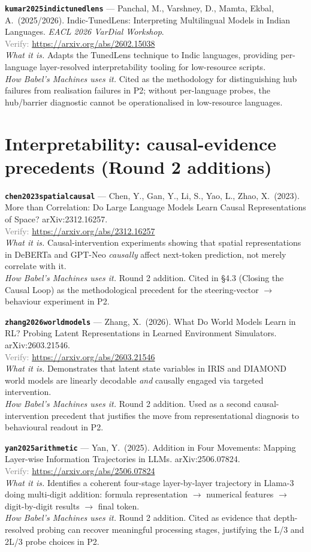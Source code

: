 \documentclass[11pt,a4paper]{article}
\newcommand{\entry}[5]{%
  \par\smallskip
  \noindent\textbf{\texttt{#1}} --- #2\\
  {\footnotesize \textcolor{gray}{Verify:} \url{#3}}\\
  \textit{What it is.} #4\\
  \textit{How Babel's Machines uses it.} #5
  \par\medskip
}
\begin{document}
\entry{kumar2025indictunedlens}
{Panchal, M., Varshney, D., Mamta, Ekbal, A.\ (2025/2026). Indic-TunedLens: Interpreting Multilingual Models in Indian Languages. \emph{EACL 2026 VarDial Workshop}.}
{https://arxiv.org/abs/2602.15038}
{Adapts the TunedLens technique to Indic languages, providing per-language layer-resolved interpretability tooling for low-resource scripts.}
{Cited as the methodology for distinguishing hub failures from realisation failures in P2; without per-language probes, the hub/barrier diagnostic cannot be operationalised in low-resource languages.}

\section{Interpretability: causal-evidence precedents (Round 2 additions)}

\entry{chen2023spatialcausal}
{Chen, Y., Gan, Y., Li, S., Yao, L., Zhao, X.\ (2023). More than Correlation: Do Large Language Models Learn Causal Representations of Space? arXiv:2312.16257.}
{https://arxiv.org/abs/2312.16257}
{Causal-intervention experiments showing that spatial representations in DeBERTa and GPT-Neo \emph{causally} affect next-token prediction, not merely correlate with it.}
{Round 2 addition. Cited in \S 4.3 (Closing the Causal Loop) as the methodological precedent for the steering-vector $\to$ behaviour experiment in P2.}

\entry{zhang2026worldmodels}
{Zhang, X.\ (2026). What Do World Models Learn in RL? Probing Latent Representations in Learned Environment Simulators. arXiv:2603.21546.}
{https://arxiv.org/abs/2603.21546}
{Demonstrates that latent state variables in IRIS and DIAMOND world models are linearly decodable \emph{and} causally engaged via targeted intervention.}
{Round 2 addition. Used as a second causal-intervention precedent that justifies the move from representational diagnosis to behavioural readout in P2.}

\entry{yan2025arithmetic}
{Yan, Y.\ (2025). Addition in Four Movements: Mapping Layer-wise Information Trajectories in LLMs. arXiv:2506.07824.}
{https://arxiv.org/abs/2506.07824}
{Identifies a coherent four-stage layer-by-layer trajectory in Llama-3 doing multi-digit addition: formula representation $\to$ numerical features $\to$ digit-by-digit results $\to$ final token.}
{Round 2 addition. Cited as evidence that depth-resolved probing can recover meaningful processing stages, justifying the L/3 and 2L/3 probe choices in P2.}
\end{document}
